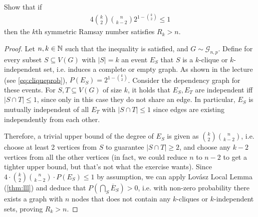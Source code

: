 \begin{aufgabe}
	Show that if
	\begin{align*}
		4 \binom{k}{2}\binom{n}{k-2}2^{1-\binom{k}{2}} \leq 1
	\end{align*}
	then the $k$th symmetric Ramsay number satisfies $R_k > n$.

	\begin{proof}
		Let $n,k \in \mathbb{N}$ such that the inequality is satisfied, and $G \sim \mathcal{G}_{n,p}$.
		Define for every subset $S \subseteq V(G)$ with $|S|=k$ an event $E_S$ that $S$ is a $k$-clique or $k$-independent set, i.e. induces a complete or empty graph.
		As shown in the lecture (see \eqref{eq:cliqueprob}), $P(E_S) = 2^{1-\binom{k}{2}}$.
		Consider the dependency graph for these events.
		For $S,T \subseteq V(G)$ of size $k$, it holds that $E_S,E_T$ are independent iff $|S\cap T| \leq 1$,
		since only in this case they do not share an edge.
		In particular, $E_S$ is mutually independent of all $E_T$ with $|S \cap T| \leq 1$ since edges are existing independently from each other.

		Therefore, a trivial upper bound of the degree of $E_S$ is given as $\binom{k}{2}\binom{n}{k-2}$,
		i.e. choose at least 2 vertices from $S$ to guarantee $|S \cap T| \geq 2$, and choose any $k-2$ vertices from all the other vertices
		(in fact, we could reduce $n$ to $n-2$ to get a tighter upper bound, but that's not what the exercise wants).
		Since $4 \cdot \binom{k}{2}\binom{n}{k-2} \cdot P(E_S) \leq 1$ by assumption,
		we can apply Lovász Local Lemma (\autoref{thm:lll}) and deduce that $P(\bigcap_S \overline{E}_S) > 0$,
		i.e. with non-zero probability there exists a graph with $n$ nodes that does not contain any $k$-cliques or $k$-independent sets,
		proving $R_k > n$.
	\end{proof}
\end{aufgabe}
